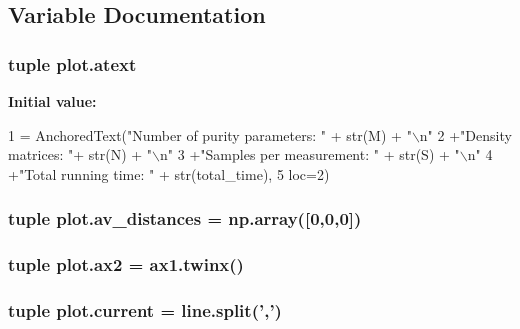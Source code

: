 \subsection{Variable Documentation}
\hypertarget{namespaceplot_a73adf0d804e9c50fb4c9a8d30e6112f3}{
\subsubsection[{atext}]{\setlength{\rightskip}{0pt plus 5cm}tuple plot.\+atext}}\label{namespaceplot_a73adf0d804e9c50fb4c9a8d30e6112f3}
{\bfseries Initial value\+:}
\begin{DoxyCode}
1 = AnchoredText(\textcolor{stringliteral}{"Number of purity parameters: "} + str(M) + \textcolor{stringliteral}{"\(\backslash\)n"}
2                      +\textcolor{stringliteral}{"Density matrices: "}+ str(N) + \textcolor{stringliteral}{"\(\backslash\)n"}
3                      +\textcolor{stringliteral}{"Samples per measurement: "} + str(S) + \textcolor{stringliteral}{"\(\backslash\)n"}
4                      +\textcolor{stringliteral}{"Total running time:  "} + str(total\_time),
5                      loc=2)
\end{DoxyCode}
\hypertarget{namespaceplot_aa802f761d87c652c2b2d42d1df226cbe}{
\subsubsection[{av\+\_\+distances}]{\setlength{\rightskip}{0pt plus 5cm}tuple plot.\+av\+\_\+distances = np.\+array(\mbox{[}0,0,0\mbox{]})}}\label{namespaceplot_aa802f761d87c652c2b2d42d1df226cbe}
\hypertarget{namespaceplot_a1b4b1cb4d1fa8a5a42231982413b9a90}{
\subsubsection[{ax2}]{\setlength{\rightskip}{0pt plus 5cm}tuple plot.\+ax2 = ax1.\+twinx()}}\label{namespaceplot_a1b4b1cb4d1fa8a5a42231982413b9a90}
\hypertarget{namespaceplot_ac521044b45248b4566a26825505c17ed}{
\subsubsection[{current}]{\setlength{\rightskip}{0pt plus 5cm}tuple plot.\+current = line.\+split(',')}}\label{namespaceplot_ac521044b45248b4566a26825505c17ed}
